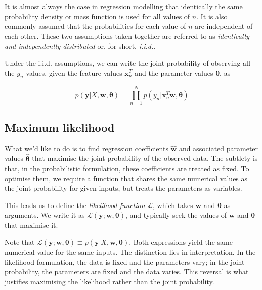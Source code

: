 \documentclass[11pt]{article}
\begin{document}
	It is almost always the case in regression modelling that identically the same probability density or mass function is used for all values of $n$. It is also commonly assumed that the probabilities for each value of $n$ are independent of each other. These two assumptions taken together are referred to as \emph{identically and independently distributed} or, for short, \emph{i.i.d.}.
	
	Under the i.i.d. assumptions, we can write the joint probability of observing all the $y_n$ values, given the feature values $\boldsymbol{x}^{T}_{n}$ and the parameter values $\boldsymbol{\theta}$, as
	
	\begin{equation}
		p(\boldsymbol{y} | X, \boldsymbol{w}, \boldsymbol{\theta}) = \prod_{n=1}^{N} p(y_n|\boldsymbol{x}^{T}_{n} \boldsymbol{w}, \boldsymbol{\theta})	
	\end{equation}
	
	\subsection{Maximum likelihood}
	
	What we'd like to do is to find regression coefficients \(\boldsymbol{\hat{w}} \) and associated parameter values \( \boldsymbol{\hat{\theta}} \) that maximise the joint probability of the observed data. The subtlety is that, in the probabilistic formulation, these coefficients are treated as fixed. To optimise them, we require a function that shares the same numerical values as the joint probability for given inputs, but treats the parameters as variables.
	
	This leads us to define the \emph{likelihood function} \( \mathcal{L} \), which takes \( \boldsymbol{w} \) and \( \boldsymbol{\theta} \) as arguments. We write it as \( \mathcal{L}(\boldsymbol{y}; \boldsymbol{w}, \boldsymbol{\theta}) \), and typically seek the values of \( \boldsymbol{w} \) and \( \boldsymbol{\theta} \) that maximise it.
	
	Note that \( \mathcal{L}(\boldsymbol{y}; \boldsymbol{w}, \boldsymbol{\theta}) \equiv p(\boldsymbol{y} | X, \boldsymbol{w}, \boldsymbol{\theta}) \). Both expressions yield the same numerical value for the same inputs. The distinction lies in interpretation. In the likelihood formulation, the data is fixed and the parameters vary; in the joint probability, the parameters are fixed and the data varies. This reversal is what justifies maximising the likelihood rather than the joint probability.
	
\end{document}
